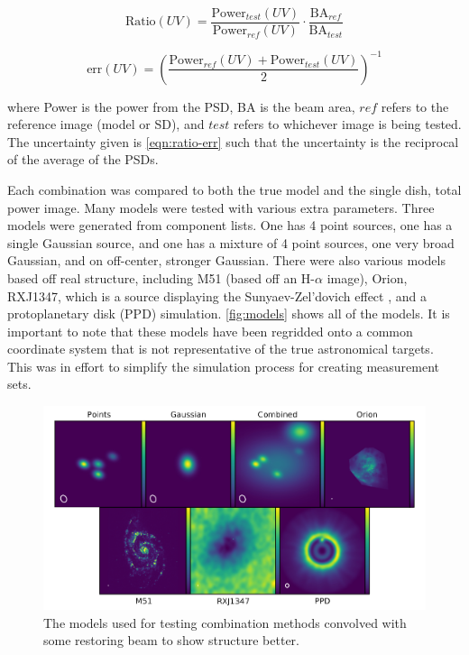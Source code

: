 \documentclass[preprint]{aastex63}
\begin{document}
\begin{equation}
    \text{Ratio}(UV) = \frac{\text{Power}_{test}(UV)}{\text{Power}_{ref}(UV)} \cdot \frac{\text{BA}_{ref}}{\text{BA}_{test}}
    \label{eqn:ratio}
\end{equation} 

\begin{equation}
    \text{err}(UV) = \left(\frac{\text{Power}_{ref}(UV)+ \text{Power}_{test}(UV)}{2}\right)^{-1}
    \label{eqn:ratio-err}
\end{equation} 

where Power is the power from the PSD, BA is the beam area, $ref$ refers to the reference image (model or SD), and $test$ refers to whichever image is being tested. The uncertainty given is \autoref{eqn:ratio-err} such that the uncertainty is the reciprocal of the average of the PSDs. 

Each combination was compared to both the true model and the single dish, total power image. Many models were tested with various extra parameters. Three models were generated from component lists. One has 4 point sources, one has a single Gaussian source, and one has a mixture of 4 point sources, one very broad Gaussian, and on off-center, stronger Gaussian. There were also various models based off real structure, including M51 (based off an H-$\alpha$ image), Orion, RXJ1347, which is a source displaying the Sunyaev-Zel'dovich effect \citep{2016PASJ...68...88K}, and a protoplanetary disk (PPD) simulation. \autoref{fig:models} shows all of the models. It is important to note that these models have been regridded onto a common coordinate system that is not representative of the true astronomical targets. This was in effort to simplify the simulation process for creating measurement sets. 

\begin{figure}[t]
    \includegraphics[width=\textwidth]{figures/models}
    \caption{The models used for testing combination methods convolved with some restoring beam to show structure better.}
    \label{fig:models}
\end{figure}
\end{document}
